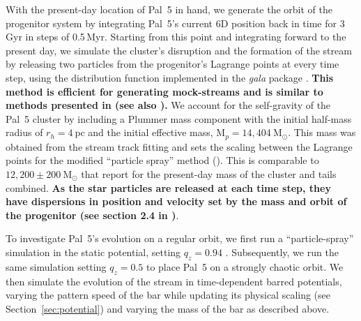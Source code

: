 \documentclass[twocolumn]{aastex62}
\newcommand{\package}[1]{\textsl{#1}}
\newcommand{\msun}{\textrm{M}_\odot}
\newcommand{\changes}[1]{{\textbf{#1}}}
\begin{document}
With the present-day location of Pal~5 in hand, we generate the orbit of the progenitor system by integrating Pal~5's current 6D position back in time for 3\,Gyr in steps of 0.5\,Myr.
Starting from this point and integrating forward to the present day, we simulate the cluster's disruption and the formation of the stream by releasing two particles from the progenitor's Lagrange points at every time step, using the \citet{Fardal:2015} distribution function implemented in the \package{gala} package \citep{gala}.
\changes{This method is efficient for generating mock-streams and is similar to methods presented in \citet{Kupper:2012} (see also \citealt{Varghese:2011, Lane:2012, Gibbons:2014}).}
We account for the self-gravity of the Pal~5 cluster by including a Plummer mass component with the initial half-mass radius of $r_h = 4~\textrm{pc}$ and the initial effective mass, $\textrm{M}_p = 14,404~\msun$.
This mass was obtained from the stream track fitting and sets the scaling between the Lagrange points for the modified ``particle spray'' method (\citealt{Fardal:2015}).
This is comparable to $12,200 \pm 200~\msun$ that \citet{Ibata:2017} report for the present-day mass of the cluster and tails combined.
\changes{As the star particles are released at each time step, they have dispersions in position and velocity set by the mass and
orbit of the progenitor (see section 2.4 in \citealt{Fardal:2015})}.

To investigate Pal~5's evolution on a regular orbit, we first run a ``particle-spray'' simulation in the static potential, setting $q_z = 0.94$ \citep{Bovy:2016}.
Subsequently, we run the same simulation setting $q_z = 0.5$ to place Pal~5 on a strongly chaotic orbit.
We then simulate the evolution of the stream in time-dependent barred potentials, varying the pattern speed of the bar while updating its physical scaling (see Section~\ref{sec:potential}) and varying the mass of the bar as described above.
\end{document}

